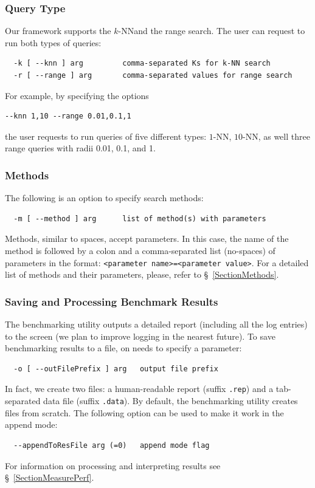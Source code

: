 \documentclass[runningheads,a4paper]{llncs}
\newcommand{\ttt}[1]{\texttt{#1}}
\newcommand{\knn}{$k$-NN}
\begin{document}
{\subsubsection{Query Type} 
Our framework supports the \knn and the range search.
The user can request to run both types of queries:
\begin{verbatim}
  -k [ --knn ] arg         comma-separated Ks for k-NN search
  -r [ --range ] arg       comma-separated values for range search
\end{verbatim}
For example, by specifying the options 
\begin{verbatim}
--knn 1,10 --range 0.01,0.1,1
\end{verbatim}
the user requests to run queries of five different types: $1$-NN, $10$-NN,
as well three range queries with radii 0.01, 0.1, and 1.

\subsubsection{Methods}
The following is an option to specify search methods:
\begin{verbatim}
  -m [ --method ] arg      list of method(s) with parameters
\end{verbatim}
Methods, similar to spaces, accept parameters. 
In this case,
the name of the method is followed by a colon and a comma-separated list (no-spaces)
of parameters in the format:
\ttt{<parameter name>=<parameter value>}.
For a detailed list of methods and their parameters, please, refer to \S~\ref{SectionMethods}.

\subsubsection{Saving and Processing Benchmark Results}
The benchmarking utility outputs a detailed report (including all the log entries) to the screen
(we plan to improve logging in the nearest future).
To save benchmarking results to a file, on needs to specify a parameter:
\begin{verbatim}
  -o [ --outFilePrefix ] arg   output file prefix
\end{verbatim}
In fact, we create two files: a human-readable report (suffix \ttt{.rep}) and 
a tab-separated data file (suffix \ttt{.data}).
By default, the benchmarking utility creates files from scratch. The
following option can be used to make it work in the append mode:
\begin{verbatim}
  --appendToResFile arg (=0)   append mode flag
\end{verbatim}
For information on processing and interpreting results see \S~\ref{SectionMeasurePerf}.

}
\end{document}
